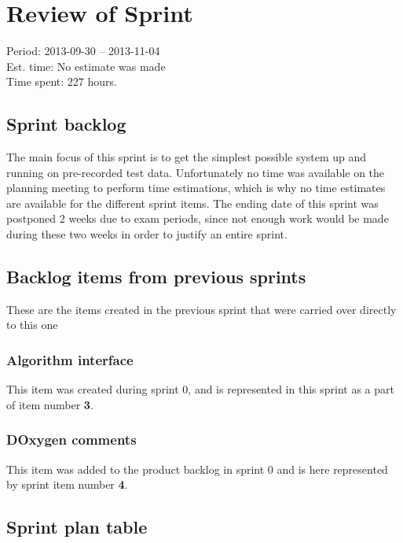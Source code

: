 \section{Review of Sprint \sprintnum}
\label{sec:sprint1}
\large Period: 2013-09-30 -- 2013-11-04 \\ 
\large Est. time: No estimate was made \\
\large Time spent: 227 hours.

\subsection{Sprint backlog}
The main focus of this sprint is to get the simplest possible system up and running on pre-recorded test data. Unfortunately no time was available on the planning meeting to perform time estimations, which is why no time estimates are available for the different sprint items. The ending date of this sprint was postponed 2 weeks due to exam periods, since not enough work would be made during these two weeks in order to justify an entire sprint.

\subsection{Backlog items from previous sprints}
These are the items created in the previous sprint that were carried over directly to this one

\subsubsection{Algorithm interface}
This item was created during sprint 0, and is represented in this sprint as a part of item number \textbf{3}.

\subsubsection{DOxygen comments}
This item was added to the product backlog in sprint 0 and is here represented by sprint item number \textbf{4}. 
\newpage

\subsection{Sprint plan table}

